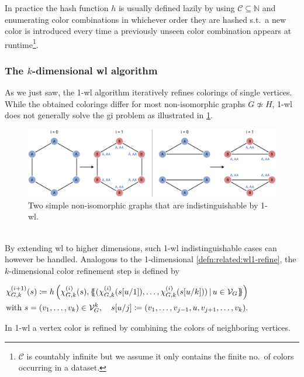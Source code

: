In practice the hash function $h$ is usually defined lazily by using $\mathcal{C} \subseteq \mathbb{N}$ and enumerating color combinations in whichever order they are hashed s.t.\ a new color is introduced every time a previously unseen color combination appears at runtime\footnote{
	$\mathcal{C}$ is countably infinite but we assume it only contains the finite no.\ of colors occurring in a dataset.
}.

\subsubsection{The $k$-dimensional \acs{wl} algorithm}
As we just saw, the 1-\acs{wl} algorithm iteratively refines colorings of single vertices.
While the obtained colorings differ for most non-isomorphic graphs $G \not\simeq H$, 1-\acs{wl} does not generally solve the \ac{gi} problem as illustrated in \cref{fig:related:wl1-problem}.
\begin{figure}[ht]
	\centering
	\includegraphics[width=\linewidth]{gfx/related-work/wl1-problem.pdf}
	\caption[Two simple non-isomorphic graphs that are indistinguishable by 1-\acs{wl}.]{
		Two simple non-isomorphic graphs that are indistinguishable by 1-\acs{wl}.
	}\label{fig:related:wl1-problem}
\end{figure}\\
By extending \ac{wl} to higher dimensions, such 1-\acs{wl} indistinguishable cases can however be handled.
Analogous to the 1-dimensional \cref{defn:related:wl1-refine}, the $k$-dimensional color refinement step is defined by
\begin{defn}\label{defn:related:wlk-refine}
	$\begin{aligned}[t]
		\chi_{G,k}^{(i+1)}(s) \coloneqq h\left(\chi_{G,k}^{(i)}(s), \ldblbrace (\chi_{G,k}^{(i)}(s[u/1]), \dots, \chi_{G,k}^{(i)}(s[u/k]))\, |\, u \in \mathcal{V}_G \rdblbrace\right)\\
		\text{with } s = (v_1, \dots, v_k) \in \mathcal{V}_G^k,\quad s[u/j] \coloneqq (v_1, \dots, v_{j-1}, u, v_{j+1}, \dots, v_k) \text{.}
	\end{aligned}$
\end{defn}
In 1-\acs{wl} a vertex color is refined by combining the colors of neighboring vertices.

